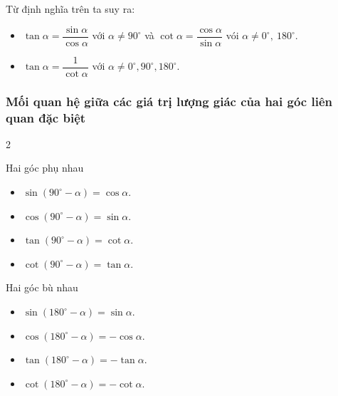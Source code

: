 \begin{note}
	Từ định nghĩa trên ta suy ra:
		\begin{itemize}
		\item $\tan \alpha = \dfrac{\sin \alpha}{\cos \alpha}$ với $\alpha \ne 90^\circ$ \quad và \quad $\cot \alpha = \dfrac{\cos \alpha}{\sin \alpha}$ vói $\alpha \ne 0^\circ,\ 180^\circ$.
		\item $\tan \alpha = \dfrac{1}{\cot \alpha}$ với $\alpha \ne 0^\circ, 90^\circ, 180^\circ$.
	\end{itemize}
\end{note}

\subsubsection{Mối quan hệ giữa các giá trị lượng giác của hai góc liên quan đặc biệt}
\begin{multicols}{2}
	\begin{khung4}{Hai góc phụ nhau}
		\begin{itemize}
			\item $\sin\left(90^{\circ}-\alpha\right)=\cos\alpha$.
			\item $\cos\left(90^{\circ}-\alpha\right)=\sin\alpha$.
			\item $\tan\left(90^{\circ}-\alpha\right)=\cot\alpha$.
			\item $\cot\left(90^{\circ}-\alpha\right)=\tan\alpha$.
		\end{itemize}
	\end{khung4}
	\begin{khung4}{Hai góc bù nhau}
		\begin{itemize}
			\item $\sin\left(180^{\circ}-\alpha\right)=\sin\alpha$.
			\item $\cos\left(180^{\circ}-\alpha\right)=-\cos\alpha$.
			\item $\tan\left(180^{\circ}-\alpha\right)=-\tan\alpha$.
			\item $\cot\left(180^{\circ}-\alpha\right)=-\cot\alpha$.
		\end{itemize}
	\end{khung4}

\end{multicols}
